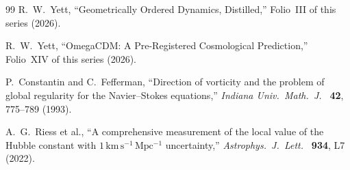 \documentclass{alienfolio}
\begin{document}
\begin{thebibliography}{99}
 R.~W.~Yett, ``Geometrically Ordered Dynamics,
Distilled,'' Folio~III of this series (2026).

 R.~W.~Yett, ``OmegaCDM: A Pre-Registered
Cosmological Prediction,'' Folio~XIV of this series (2026).

 P.~Constantin and C.~Fefferman, ``Direction of
vorticity and the problem of global regularity for the
Navier--Stokes equations,'' \emph{Indiana Univ.\ Math.\ J.\ }
\textbf{42}, 775--789 (1993).

 A.~G.~Riess et al., ``A comprehensive measurement of
the local value of the Hubble constant with $1\,\mathrm{km\,s^{-1}\,
Mpc^{-1}}$ uncertainty,'' \emph{Astrophys.\ J.\ Lett.\ }
\textbf{934}, L7 (2022).

\end{thebibliography}
\end{document}
